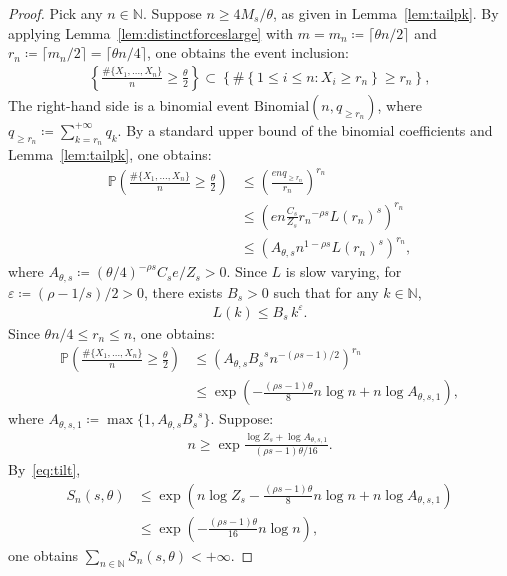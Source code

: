 \documentclass[12pt,reqno]{amsart}
\theoremstyle{definition}
\theoremstyle{plain}
\begin{document}
\begin{proof}
Pick any $n\in\mathbb{N}$. Suppose $n\geq4M_s/\theta$, as given in Lemma~\ref{lem:tailpk}. By applying Lemma~\ref{lem:distinctforceslarge} with $m=m_n\coloneqq\lceil \theta n/2\rceil$ and $r_n\coloneqq \lceil m_n/2\rceil = \lceil \theta n/4\rceil$, one obtains the event inclusion:
\begin{align*}
    \left\{\frac{\#\{X_1,\ldots,X_n\}}{n}\geq \frac{\theta}{2}\right\}
    \subset \left\{\#\left\{1\leq i\leq n: X_i\geq r_n\right\}\geq r_n\right\},
\end{align*}
The right-hand side is a binomial event $\mathrm{Binomial}(n,q_{\geq r_n})$, where $q_{\geq {r_n}}\coloneqq\sum_{k={r_n}}^{+\infty}q_k$. By a standard upper bound of the binomial coefficients and Lemma~\ref{lem:tailpk}, one obtains:
\begin{align*}
    \mathbb{P}\left(\frac{\#\{X_1,\ldots,X_n\}}{n}\geq \frac{\theta}{2} \right)
    &\leq\left(\frac{enq_{\geq r_n}}{r_n}\right)^{r_n} \\
    &\leq\left(en\frac{C_s}{Z_s}{r_n}^{-\rho s}{L(r_n)}^s\right)^{r_n} \\
    &\leq\left(A_{\theta,s}n^{1-\rho s}{L(r_n)}^s\right)^{r_n}
    ,
\end{align*}
where $A_{\theta,s}\coloneqq (\theta/4)^{-\rho s}C_se/Z_s>0$. Since $L$ is slow varying, for $\varepsilon\coloneqq (\rho-1/s)/2>0$, there exists $B_s>0$ such that for any $k\in\mathbb{N}$,
\begin{align*}
    L(k)\leq B_s\,k^\varepsilon.
\end{align*}
Since $\theta n/4\leq r_n\leq n$, one obtains:
\begin{align*}
    \mathbb{P}\left(\frac{\#\{X_1,\ldots,X_n\}}{n}\geq \frac{\theta}{2} \right)
    &\leq \left(A_{\theta,s}{B_s}^sn^{-(\rho s-1)/2}\right)^{r_n} \\
    &\leq\exp{\left(-\frac{(\rho s-1)\theta}{8}n\log{n}+n\log{A_{\theta,s,1}}\right)}
    ,
\end{align*}
where $A_{\theta,s,1}\coloneqq \max\{1,A_{\theta,s}{B_s}^s\}$. Suppose:
\begin{align*}
    n\geq\exp{\frac{\log{Z_s}+\log{A_{\theta,s,1}}}{(\rho s-1)\theta/16}}.
\end{align*}
By~\eqref{eq:tilt},
\begin{align*}
    S_n(s,\theta)
    &\leq \exp{\left(n\log{Z_s}-\frac{(\rho s-1)\theta}{8}n\log{n}+n\log{A_{\theta,s,1}}\right)} \\
    &\leq \exp{\left(-\frac{(\rho s-1)\theta}{16}n\log{n}\right)},
\end{align*}
one obtains $\sum_{n\in\mathbb{N}} S_n(s,\theta)<+\infty$.


\end{proof}
\end{document}
